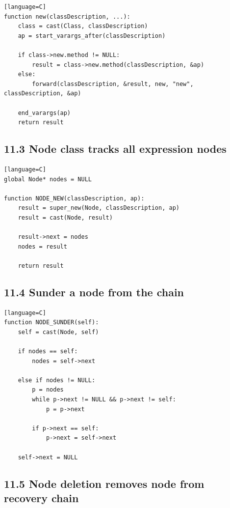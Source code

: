 \documentclass[11pt]{article}
\begin{document}
\begin{verbatim}[language=C]
function new(classDescription, ...):
    class = cast(Class, classDescription)
    ap = start_varargs_after(classDescription)

    if class->new.method != NULL:
        result = class->new.method(classDescription, &ap)
    else:
        forward(classDescription, &result, new, "new", classDescription, &ap)

    end_varargs(ap)
    return result
\end{verbatim}

\subsection{11.3 Node class tracks all expression
nodes}\label{node-class-tracks-all-expression-nodes}

\begin{verbatim}[language=C]
global Node* nodes = NULL

function NODE_NEW(classDescription, ap):
    result = super_new(Node, classDescription, ap)
    result = cast(Node, result)

    result->next = nodes
    nodes = result

    return result
\end{verbatim}

\subsection{11.4 Sunder a node from the
chain}\label{sunder-a-node-from-the-chain}

\begin{verbatim}[language=C]
function NODE_SUNDER(self):
    self = cast(Node, self)

    if nodes == self:
        nodes = self->next

    else if nodes != NULL:
        p = nodes
        while p->next != NULL && p->next != self:
            p = p->next

        if p->next == self:
            p->next = self->next

    self->next = NULL
\end{verbatim}

\subsection{11.5 Node deletion removes node from recovery
chain}\label{node-deletion-removes-node-from-recovery-chain}
\end{document}

